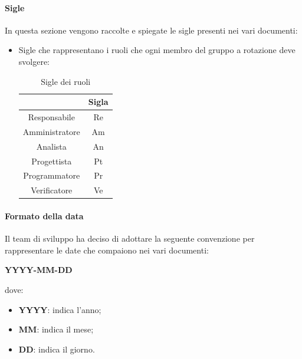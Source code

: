 \paragraph{Sigle}
In questa sezione vengono raccolte e spiegate le sigle presenti nei vari documenti:
\begin{itemize}
    \item Sigle che rappresentano i ruoli che ogni membro del gruppo a rotazione deve svolgere:
          \begin{table}[H]
              \centering
              \renewcommand{\arraystretch}{1.8}
              \begin{tabular}{c|c}
                  \rowcolor[HTML]{125E28}
                  \multicolumn{1}{c}{\color[HTML]{FFFFFF}\textbf{Ruolo}}
                                 & \multicolumn{1}{c}{\color[HTML]{FFFFFF}\textbf{Sigla}} \\
                  \hline
                  Responsabile   & Re                                                     \\
                  Amministratore & Am                                                     \\
                  Analista       & An                                                     \\
                  Progettista    & Pt                                                     \\
                  Programmatore  & Pr                                                     \\
                  Verificatore   & Ve
              \end{tabular}
              \caption{Sigle dei ruoli}
          \end{table}
\end{itemize}
\paragraph{Formato della data}
Il team di sviluppo ha deciso di adottare la seguente convenzione per rappresentare le date che compaiono nei vari documenti:
\begin{center}
    \large{\textbf{YYYY-MM-DD}}
\end{center}
dove:
\begin{itemize}
    \item \textbf{YYYY}: indica l'anno;
    \item \textbf{MM}: indica il mese;
    \item \textbf{DD}: indica il giorno.
\end{itemize}

